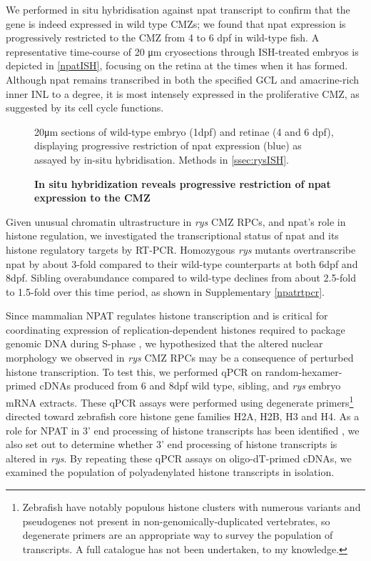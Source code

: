 We performed in situ hybridisation against npat transcript to confirm that the gene is indeed expressed in wild type CMZs; we found that npat expression is progressively restricted to the CMZ from 4 to 6 dpf in wild-type fish. A representative time-course of 20 \si{\micro\metre} cryosections through ISH-treated embryos is depicted in \autoref{npatISH}, focusing on the retina at the times when it has formed. Although npat remains transcribed in both the specified GCL and amacrine-rich inner INL to a degree, it is most intensely expressed in the proliferative CMZ, as suggested by its cell cycle functions.

\begin{figure}[!h]
    \caption{{\bf In situ hybridization reveals progressive restriction of npat expression to the CMZ}}
    20\si{\micro\metre} sections of wild-type embryo (1dpf) and retinae (4 and 6 dpf), displaying progressive restriction of npat expression (blue) as assayed by in-situ hybridisation.
    Methods in \autoref{ssec:rysISH}.
    \label{npatISH}
\end{figure}

Given unusual chromatin ultrastructure in \textit{rys} CMZ RPCs, and npat's role in histone regulation, we investigated the transcriptional status of npat and its histone regulatory targets by RT-PCR. Homozygous \textit{rys} mutants overtranscribe npat by about 3-fold compared to their wild-type counterparts at both 6dpf and 8dpf. Sibling overabundance compared to wild-type declines from about 2.5-fold to 1.5-fold over this time period, as shown in Supplementary \autoref{npatrtpcr}.

Since mammalian NPAT regulates histone transcription and is critical for coordinating expression of replication-dependent histones required to package genomic DNA during S-phase \cite{Zhao2000}, we hypothesized that the altered nuclear morphology we observed in \textit{rys} CMZ RPCs may be a consequence of perturbed histone transcription. To test this, we performed qPCR on random-hexamer-primed cDNAs produced from 6 and 8dpf wild type, sibling, and \textit{rys} embryo mRNA extracts. These qPCR assays were performed using degenerate primers\footnote{Zebrafish have notably populous histone clusters with numerous variants and pseudogenes not present in non-genomically-duplicated vertebrates, so degenerate primers are an appropriate way to survey the population of transcripts. A full catalogue has not been undertaken, to my knowledge.} directed toward zebrafish core histone gene families H2A, H2B, H3 and H4. As a role for NPAT in 3’ end processing of histone transcripts has been identified \cite{Pirngruber2010}, we also set out to determine whether 3’ end processing of histone transcripts is altered in \textit{rys}. By repeating these qPCR assays on oligo-dT-primed cDNAs, we examined the population of polyadenylated histone transcripts in isolation. 

